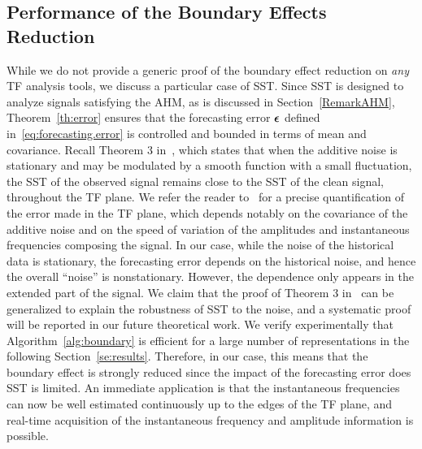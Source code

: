 \subsection{Performance of the Boundary Effects Reduction}
\label{sse:perf.BoundEffRed}
While we do not provide a generic proof of the boundary effect reduction on {\em any} TF analysis tools, we discuss a particular case of SST. Since SST is designed to analyze signals satisfying the AHM, as is discussed in Section~\ref{RemarkAHM}, Theorem~\ref{th:error} ensures that the forecasting error $\boldsymbol{\epsilon}$ defined in~\eqref{eq:forecasting.error} is controlled and bounded in terms of mean and covariance. Recall Theorem 3 in~\cite{Chen14nonparametric}, which states that when the additive noise is stationary and may be modulated by a smooth function with a small fluctuation, the SST of the observed signal remains close to the SST of the clean signal, throughout the TF plane. 
%
We refer the reader to~\cite{Chen14nonparametric} for a precise quantification of the error made in the TF plane, which depends notably on the covariance of the additive noise and on the speed of variation of the amplitudes and instantaneous frequencies composing the signal. 
%
In our case, while the noise of the historical data is stationary, the forecasting error depends on the historical noise, and hence the overall ``noise'' is nonstationary. However, the dependence only appears in the extended part of the signal. We claim that the proof of Theorem 3 in~\cite{Chen14nonparametric} can be generalized to explain the robustness of SST to the noise, and a systematic proof will be reported in our future theoretical work. We verify experimentally that Algorithm~\ref{alg:boundary} is efficient for a large number of representations in the following Section~\ref{se:results}. 
%
Therefore, in our case, this means that the boundary effect is strongly reduced since the impact of the forecasting error does SST is limited. An immediate application is that the instantaneous frequencies can now be well estimated continuously up to the edges of the TF plane, and real-time acquisition of the instantaneous frequency and amplitude information is possible.